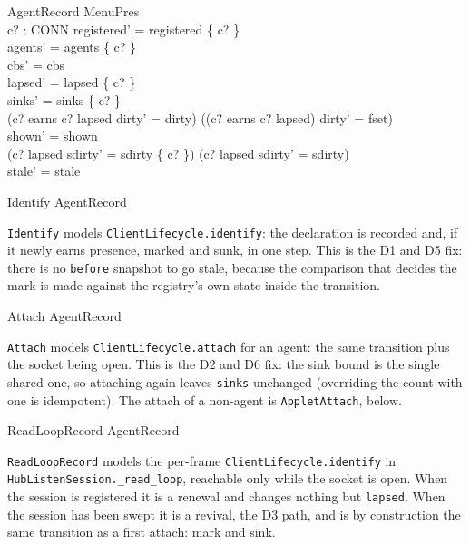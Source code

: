 \documentclass[a4paper,10pt,fleqn]{article}
\begin{document}
\begin{schema}{AgentRecord}
  \Delta MenuPres \\
  c? : CONN
\where
  registered' = registered \cup \{ c? \} \\
  agents' = agents \cup \{ c? \} \\
  cbs' = cbs \\
  lapsed' = lapsed \setminus \{ c? \} \\
  sinks' = sinks \oplus \{ c?  \} \\
  (c? \in earns \land c? \notin lapsed \land dirty' = dirty) \lor
    ((c? \notin earns \lor c? \in lapsed) \land dirty' = fset) \\
  shown' = shown \\
  (c? \in lapsed \land sdirty' = sdirty \cup \{ c? \}) \lor
    (c? \notin lapsed \land sdirty' = sdirty) \\
  stale' = stale
\end{schema}

\begin{zed}
  Identify  AgentRecord \land [\Delta MenuPres | open' = open]
\end{zed}

\texttt{Identify} models \texttt{ClientLifecycle.identify}: the declaration is
recorded and, if it newly earns presence, marked and sunk, in one step.
This is the D1 and D5 fix: there is no \texttt{before} snapshot to go stale,
because the comparison that decides the mark is made against the registry's
own state inside the transition.

\begin{zed}
  Attach  AgentRecord \land [\Delta MenuPres; c? : CONN | open' = open \cup \{ c? \}]
\end{zed}

\texttt{Attach} models \texttt{ClientLifecycle.attach} for an agent: the same
transition plus the socket being open. This is the D2 and D6 fix: the sink
bound is the single shared one, so attaching again leaves \texttt{sinks}
unchanged (overriding the count with one is idempotent). The attach of a
non-agent is \texttt{AppletAttach}, below.

\begin{zed}
  ReadLoopRecord  AgentRecord \land
    [\Delta MenuPres; c? : CONN | open' = open \land c? \in open]
\end{zed}

\texttt{ReadLoopRecord} models the per-frame \texttt{ClientLifecycle.identify}
in \texttt{HubListenSession.\_read\_loop}, reachable only while the socket is
open. When the session is registered it is a renewal and changes nothing but
\texttt{lapsed}. When the session has been swept it is a revival, the D3 path,
and is by construction the same transition as a first attach: mark and sink.
\end{document}
